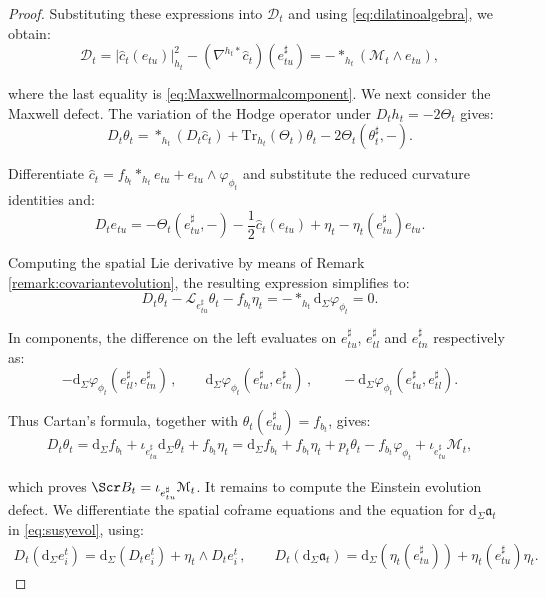 \documentclass[10pt,reqno,a4paper]{amsart}
\theoremstyle{plain}
\theoremstyle{definition}
\theoremstyle{remark}
\theoremstyle{remark}
\def\dd{\mathrm{d}}
\newcommand{\Tr}{\mathrm{Tr}}
\def\cB{\Scr B}
\def\cD{\mathcal{D}}
\def\cL{\mathcal{L}}
\def\cM{\mathcal{M}}
\def\cL{\mathcal{L}}
\def\fra{\mathfrak{a}}
\renewcommand{\(}{ (}
\renewcommand{\)}{ )}
\begin{document}
\begin{proof}
\noindent
Substituting these expressions into $\cD_t$ and using \eqref{eq:dilatinoalgebra}, we obtain:
\begin{equation*}
\cD_t =\vert\widehat{c}_t(e_{tu})\vert_{h_t}^2 -(\nabla^{h_t\ast}\widehat{c}_t)(e^{\sharp}_{tu}) =-\ast_{h_t}(\cM_t\wedge e_{tu}),
\end{equation*}

\noindent
where the last equality is \eqref{eq:Maxwellnormalcomponent}. We next consider the Maxwell defect. The variation of the Hodge operator under $D_th_t=-2\Theta_t$ gives:
\begin{equation*}
D_t\theta_t = \ast_{h_t}(D_t\widehat{c}_t) + \Tr_{h_t}(\Theta_t)\theta_t - 2\Theta_t(\theta_t^{\sharp},-).
\end{equation*}

\noindent
Differentiate $\widehat{c}_t=f_{b_t}\ast_{h_t}e_{tu} +e_{tu}\wedge\varphi_{\phi_t}$ and substitute the reduced curvature identities and:
\begin{equation*}
D_te_{tu} =-\Theta_t(e^{\sharp}_{tu},-) -\frac{1}{2}\widehat{c}_t(e_{tu}) +\eta_t-\eta_t(e^{\sharp}_{tu})e_{tu}.
\end{equation*}

\noindent
Computing the spatial Lie derivative by means of Remark \ref{remark:covariantevolution}, the resulting expression simplifies to:
\begin{equation*}
D_t\theta_t-\cL_{e^{\sharp}_{tu}}\theta_t-f_{b_t}\eta_t =-\ast_{h_t}\dd_{\Sigma}\varphi_{\phi_t}=0.
\end{equation*}

\noindent
In components, the difference on the left evaluates on $e^{\sharp}_{tu}$, $e^{\sharp}_{tl}$ and $e^{\sharp}_{tn}$ respectively as:
\begin{equation*}
-\dd_{\Sigma}\varphi_{\phi_t} (e^{\sharp}_{tl},e^{\sharp}_{tn})\, , \qquad \dd_{\Sigma}\varphi_{\phi_t}
(e^{\sharp}_{tu},e^{\sharp}_{tn})\, , \qquad -\dd_{\Sigma}\varphi_{\phi_t} (e^{\sharp}_{tu},e^{\sharp}_{tl}).
\end{equation*}

\noindent
Thus Cartan's formula, together with $\theta_t(e^{\sharp}_{tu})=f_{b_t}$, gives:
\begin{eqnarray*}
D_t\theta_t =  \dd_{\Sigma}f_{b_t} + \iota_{e^{\sharp}_{tu}}\dd_{\Sigma}\theta_t
+f_{b_t}\eta_t = \dd_{\Sigma}f_{b_t}
+f_{b_t}\eta_t+p_t\theta_t-f_{b_t}\varphi_{\phi_t}
+\iota_{e^{\sharp}_{tu}}\cM_t,
\end{eqnarray*}

\noindent
which proves $\cB_t=\iota_{e^{\sharp}_{tu}}\cM_t$. It remains to compute the Einstein evolution defect. We differentiate the spatial coframe equations and the equation for $\dd_{\Sigma}\fra_t$ in \eqref{eq:susyevol}, using:
\begin{eqnarray*}
D_t(\dd_{\Sigma}e^t_i) =\dd_{\Sigma}(D_te^t_i)+\eta_t\wedge D_te^t_i\, ,\qquad  D_t(\dd_{\Sigma}\fra_t)
=\dd_{\Sigma} (\eta_t(e^{\sharp}_{tu}) ) +\eta_t(e^{\sharp}_{tu})\eta_t.
\end{eqnarray*}


\end{proof}
\end{document}
